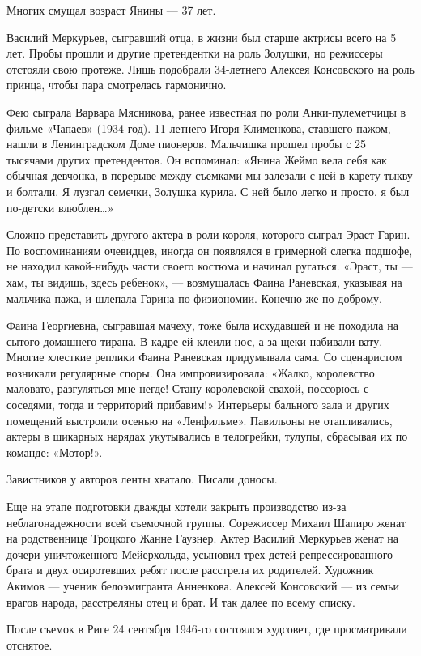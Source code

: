 Многих смущал возраст Янины — 37 лет.

Василий Меркурьев, сыгравший отца, в жизни был старше актрисы всего на 5 лет.
Пробы прошли и другие претендентки на роль Золушки, но режиссеры отстояли свою
протеже. Лишь подобрали 34-летнего Алексея Консовского на роль принца, чтобы
пара смотрелась гармонично.

Фею сыграла Варвара Мясникова, ранее известная по роли Анки-пулеметчицы в
фильме «Чапаев» (1934 год). 11-летнего Игоря Клименкова, ставшего пажом, нашли
в Ленинградском Доме пионеров. Мальчишка прошел пробы с 25 тысячами других
претендентов. Он вспоминал: «Янина Жеймо вела себя как обычная девчонка, в
перерыве между съемками мы залезали с ней в карету-тыкву и болтали. Я лузгал
семечки, Золушка курила. С ней было легко и просто, я был по-детски влюблен…»

Сложно представить другого актера в роли короля, которого сыграл Эраст Гарин.
По воспоминаниям очевидцев, иногда он появлялся в гримерной слегка подшофе, не
находил какой-нибудь части своего костюма и начинал ругаться. «Эраст, ты — хам,
ты видишь, здесь ребенок», — возмущалась Фаина Раневская, указывая на
мальчика-пажа, и шлепала Гарина по физиономии. Конечно же по-доброму.

Фаина Георгиевна, сыгравшая мачеху, тоже была исхудавшей и не походила на
сытого домашнего тирана. В кадре ей клеили нос, а за щеки набивали вату. Многие
хлесткие реплики Фаина Раневская придумывала сама. Со сценаристом возникали
регулярные споры. Она импровизировала: «Жалко, королевство маловато,
разгуляться мне негде! Стану королевской свахой, поссорюсь с соседями, тогда и
территорий прибавим!» Интерьеры бального зала и других помещений выстроили
осенью на «Ленфильме». Павильоны не отапливались, актеры в шикарных нарядах
укутывались в телогрейки, тулупы, сбрасывая их по команде: «Мотор!».

Завистников у авторов ленты хватало. Писали доносы.

Еще на этапе подготовки дважды хотели закрыть производство из-за
неблагонадежности всей съемочной группы. Сорежиссер Михаил Шапиро женат на
родственнице Троцкого Жанне Гаузнер. Актер Василий Меркурьев женат на дочери
уничтоженного Мейерхольда, усыновил трех детей репрессированного брата и двух
осиротевших ребят после расстрела их родителей. Художник Акимов — ученик
белоэмигранта Анненкова. Алексей Консовский — из семьи врагов народа,
расстреляны отец и брат. И так далее по всему списку.

После съемок в Риге 24 сентября 1946-го состоялся худсовет, где просматривали
отснятое.

